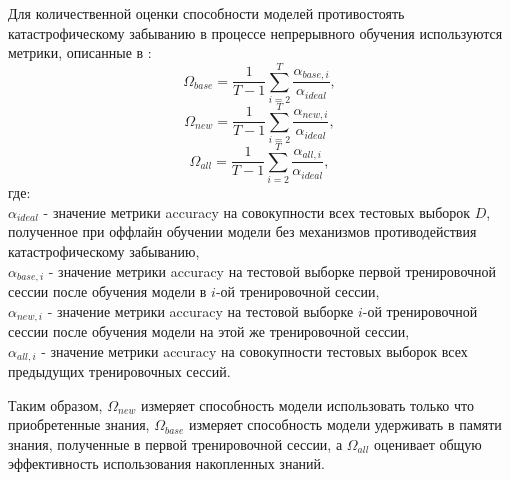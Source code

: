 \documentclass[a4paper,14pt]{extarticle}
\begin{document}
Для количественной оценки способности моделей противостоять катастрофическому
забыванию в процессе непрерывного обучения используются метрики, описанные в
\cite{kemker2017measuring}:
\begin{equation}
    \Omega_{base}=\frac{1}{T-1}\sum_{i=2}^{T}\frac{\alpha_{base,i}}{\alpha_{ideal}},
\end{equation}
\begin{equation}
    \Omega_{new}=\frac{1}{T-1}\sum_{i=2}^{T}\frac{\alpha_{new,i}}{\alpha_{ideal}},
\end{equation}
\begin{equation}
    \Omega_{all}=\frac{1}{T-1}\sum_{i=2}^{T}\frac{\alpha_{all,i}}{\alpha_{ideal}},
\end{equation}
где:\\
\(\alpha_{ideal}\) - значение метрики accuracy на совокупности всех тестовых
выборок \(D\), полученное при оффлайн обучении модели без механизмов
противодействия катастрофическому забыванию,\\
\(\alpha_{base,i}\) - значение метрики accuracy на тестовой выборке первой
тренировочной сессии после обучения модели в \(i\)-ой тренировочной
сессии,\\
\(\alpha_{new,i}\) - значение метрики accuracy на тестовой выборке \(i\)-ой
тренировочной сессии после обучения модели на этой же тренировочной сессии,\\
\(\alpha_{all,i}\) - значение метрики accuracy на совокупности тестовых выборок
всех предыдущих тренировочных сессий.

Таким образом, \(\Omega_{new}\) измеряет способность модели использовать только
что приобретенные знания, \(\Omega_{base}\) измеряет способность модели
удерживать в памяти знания, полученные в первой тренировочной сессии, а
\(\Omega_{all}\) оценивает общую эффективность использования накопленных знаний.
\end{document}
